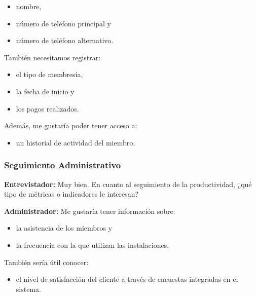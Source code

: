 \documentclass[spanish, 12pt]{article}
\providecommand{\tightlist}{\setlength{\itemsep}{0pt}
\setlength{\parskip}{0pt}}
\begin{document}
	\begin{itemize}
		\tightlist

		\item nombre,

		\item número de teléfono principal y

		\item número de teléfono alternativo.
	\end{itemize}

	También necesitamos registrar:

	\begin{itemize}
		\tightlist

		\item el tipo de membresía,

		\item la fecha de inicio y

		\item los pagos realizados.
	\end{itemize}

	Además, me gustaría poder tener acceso a:

	\begin{itemize}
		\tightlist

		\item un historial de actividad del miembro.
	\end{itemize}

	\subsubsection{Seguimiento Administrativo}
	\label{seguimiento-administrativo}

	\textbf{Entrevistador:} Muy bien. En cuanto al seguimiento de la productividad,
	¿qué tipo de métricas o indicadores le interesan?

	\textbf{Administrador:} Me gustaría tener información sobre:

	\begin{itemize}
		\tightlist

		\item la asistencia de los miembros y

		\item la frecuencia con la que utilizan las instalaciones.
	\end{itemize}

	También sería útil conocer:

	\begin{itemize}
		\tightlist

		\item el nivel de satisfacción del cliente a través de encuestas integradas en
			el sistema.
	\end{itemize}
\end{document}

